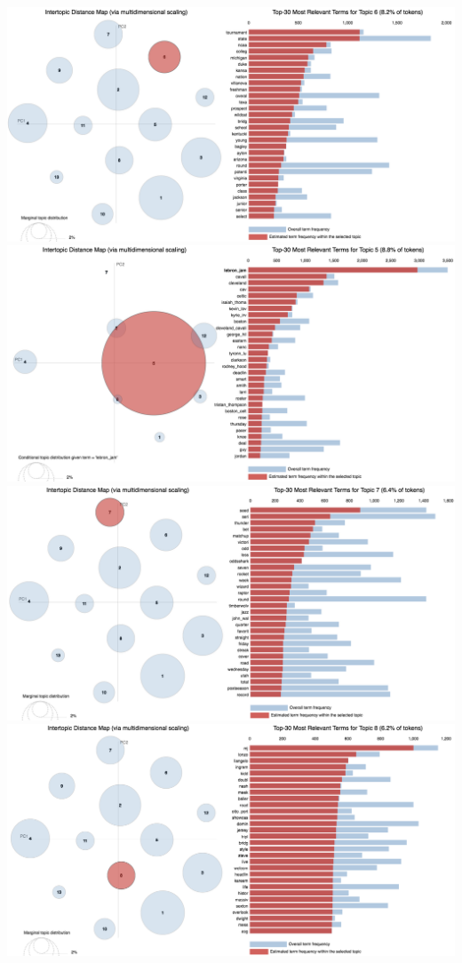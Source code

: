 \documentclass[11pt]{article}
\begin{document}
\includegraphics[width=400pt]{6.png} \\
\includegraphics[width=400pt]{6_lebron.png} \\
\includegraphics[width=400pt]{7.png} \\
\includegraphics[width=400pt]{8.png} \\
\end{document}
